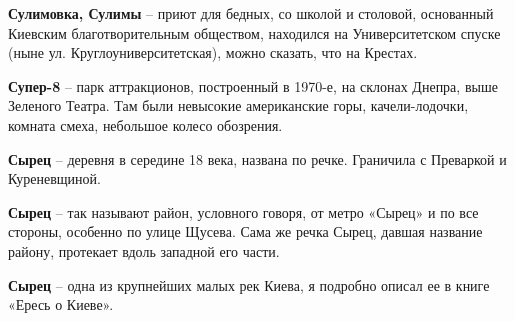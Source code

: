 \medskip

\textbf{Сулимовка, Сулимы} – приют для бедных, со школой и столовой, основанный Киевским благотворительным обществом, находился на Университетском спуске (ныне ул. Круглоуниверситетская), можно сказать, что на Крестах.\\

\medskip

\textbf{Супер-8} – парк аттракционов, построенный в 1970-е, на склонах Днепра, выше Зеленого Театра. Там были невысокие американские горы, качели-лодочки, комната смеха, небольшое колесо обозрения.\\

\medskip

\textbf{Сырец} – деревня в середине 18 века, названа по речке. Граничила с Преваркой и Куреневщиной.\\

\medskip

\textbf{Сырец} – так называют район, условного говоря, от метро «Сырец» и по все стороны, особенно по улице Щусева. Сама же речка Сырец, давшая название району, протекает вдоль западной его части.\\

\medskip


\textbf{Сырец} – одна из крупнейших малых рек Киева, я подробно описал ее в книге 
«Ересь о Киеве».







